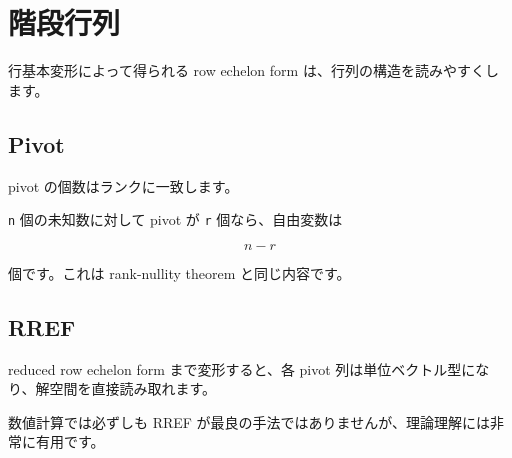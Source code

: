 \documentclass[
  11pt,
  a4paper,
]{ltjsarticle}
\author{}
\date{}
\begin{document}
\hypertarget{ux968eux6bb5ux884cux5217}{%
\section{階段行列}\label{ux968eux6bb5ux884cux5217}}

行基本変形によって得られる row echelon form
は、行列の構造を読みやすくします。

\hypertarget{pivot}{%
\subsection{Pivot}\label{pivot}}

pivot の個数はランクに一致します。

\texttt{n} 個の未知数に対して pivot が \texttt{r} 個なら、自由変数は

\[
n-r
\]

個です。これは rank-nullity theorem と同じ内容です。

\hypertarget{rref}{%
\subsection{RREF}\label{rref}}

reduced row echelon form まで変形すると、各 pivot
列は単位ベクトル型になり、解空間を直接読み取れます。

数値計算では必ずしも RREF
が最良の手法ではありませんが、理論理解には非常に有用です。
\end{document}
